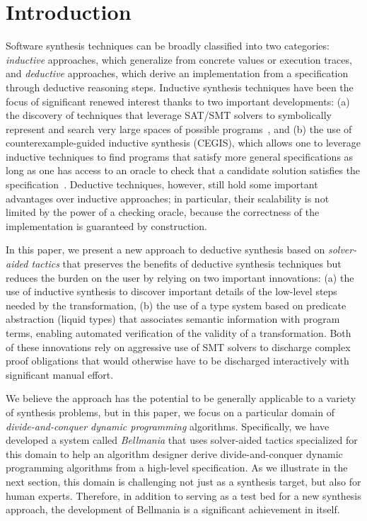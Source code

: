 \section{Introduction}
\label{intro}


\newcommand{\xidx}{i}
\newcommand{\yidx}{j}
\newcommand{\xw}[1]{w_{#1}}
\newcommand{\yw}[1]{w'_{#1}}

Software synthesis techniques can be broadly classified into two categories: \emph{inductive} approaches, which generalize from concrete values or execution traces, and \emph{deductive} approaches, which derive an implementation from a specification through deductive reasoning steps. Inductive synthesis techniques have been the focus of significant renewed interest thanks to two important developments: (a) the discovery of techniques that leverage SAT/SMT solvers to symbolically represent and search very large spaces of possible programs~\cite{APLAS09/Solar-Lezama, PLDI11/Gulwani, Onward13/Torlak}, and (b) the use of counterexample-guided inductive synthesis (CEGIS), which allows one to leverage inductive techniques to find programs that satisfy more general specifications as long as one has access to an oracle to check that a candidate solution satisfies the specification~\cite{APLAS09/Solar-Lezama}. Deductive techniques, however, still hold some important advantages over inductive approaches; in particular, their scalability is not limited by the power of a checking oracle, because the correctness of the implementation is guaranteed by construction.

In this paper, we present a new approach to deductive synthesis based on \emph{solver-aided tactics} that preserves the benefits of deductive synthesis techniques but reduces the burden on the user by relying on two important innovations: (a) the use of inductive synthesis to discover important details of the low-level steps needed by the transformation, (b) the use of a type system based on predicate abstraction (liquid types) that associates semantic information with program terms, enabling automated verification of the validity of a transformation. Both of these innovations rely on aggressive use of SMT solvers to discharge complex proof obligations that would otherwise have to be discharged interactively with significant manual effort. 

We believe the approach has the potential to be generally applicable to a variety of synthesis problems, but in this paper, we focus on a particular domain of \emph{divide-and-conquer dynamic programming} algorithms. Specifically, we have developed a system called \emph{Bellmania} that uses solver-aided tactics specialized for this domain to help an algorithm designer derive divide-and-conquer dynamic programming algorithms from a high-level specification. As we illustrate in the next section, this domain is challenging not just as a synthesis target, but also for human experts. Therefore, in addition to serving as a test bed for a new synthesis approach, the development of Bellmania is a significant achievement in itself.

